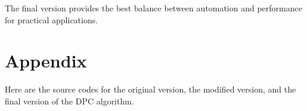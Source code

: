 \documentclass{article}
\begin{document}
The final version provides the best balance between automation and performance for practical applications.

\section{Appendix}
Here are the source codes for the original version, the modified version, and the final version of the DPC algorithm. 



\end{document}
